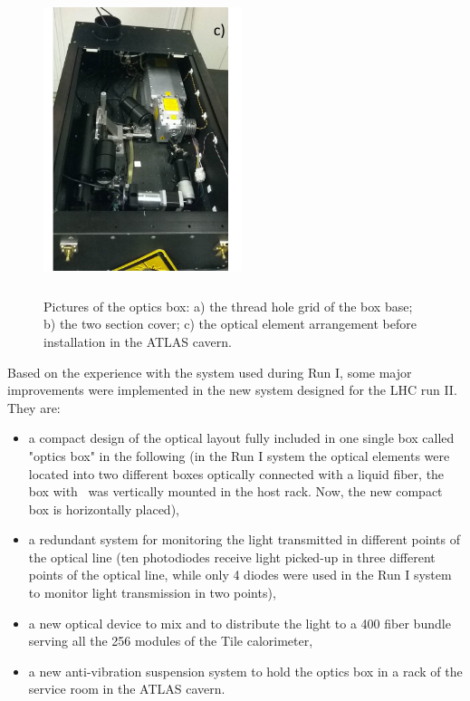 \begin{figure}[htbp]
\begin{center}
\includegraphics[width=5.8cm, height=9cm]{figures/Optics_box_3}
\caption{Pictures of the optics box: a) the thread hole grid of the box base; b) the
two section cover; c) the optical element arrangement before installation in the
ATLAS cavern.  
}\label{fig:x.0}
\end{center}
\end{figure}
%
Based on the experience with the system used during Run I, some major improvements
were implemented in the new system designed for the LHC run II. They are:
\begin{itemize}
\item a compact design of the optical layout fully included in one single box called
"optics box" in the following (in the Run I system the optical elements were located
into two different boxes optically connected with a liquid fiber, the box with \laser~was vertically mounted in the host rack. Now, the new compact box is horizontally
placed),
\item a redundant system for monitoring the light transmitted in different points of
the optical line (ten photodiodes receive light picked-up in three
different points of the optical line, while only 4 diodes were used in the Run I
system to monitor light transmission in two points),
\item a new optical device to mix and to distribute the light to a 400 fiber bundle
serving all the 256 modules of the Tile calorimeter,
\item a new anti-vibration suspension system to hold the optics box in a rack of the
service room in the ATLAS cavern.   
\end{itemize}

